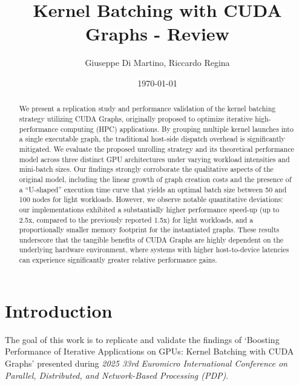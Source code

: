 \documentclass[10pt,twocolumn]{article}
\title{\textbf{Kernel Batching with CUDA Graphs - Review}}
\author{Giuseppe Di Martino, Riccardo Regina}
\date{\today}
\begin{document}
\maketitle
\thispagestyle{fancy}

\begin{abstract}
\noindent
We present a replication study and performance validation of the kernel batching strategy utilizing CUDA Graphs, originally proposed to optimize iterative high-performance computing (HPC) applications. By grouping multiple kernel launches into a single executable graph, the traditional host-side dispatch overhead is significantly mitigated. We evaluate the proposed unrolling strategy and its theoretical performance model across three distinct GPU architectures under varying workload intensities and mini-batch sizes. Our findings strongly corroborate the qualitative aspects of the original model, including the linear growth of graph creation costs and the presence of a ``U-shaped'' execution time curve that yields an optimal batch size between 50 and 100 nodes for light workloads. However, we observe notable quantitative deviations: our implementations exhibited a substantially higher performance speed-up (up to 2.5x, compared to the previously reported 1.5x) for light workloads, and a proportionally smaller memory footprint for the instantiated graphs. These results underscore that the tangible benefits of CUDA Graphs are highly dependent on the underlying hardware environment, where systems with higher host-to-device latencies can experience significantly greater relative performance gains.
\end{abstract}

\section{Introduction}
The goal of this work is to replicate and validate the findings of `Boosting Performance of Iterative Applications on GPUs: Kernel Batching with CUDA Graphs' \cite{10974864} presented during \emph{2025 33rd Euromicro International Conference on Parallel, Distributed, and Network-Based Processing (PDP)}.
\end{document}
